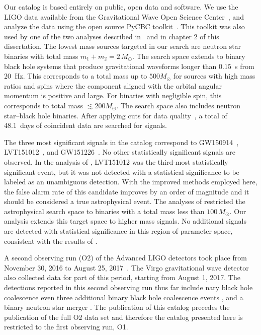 Our catalog is based entirely on public, open data and software. We use the LIGO data available from the Gravitational Wave Open Science Center~\citep{Vallisneri:2014vxa}, and analyze the data using the open source PyCBC toolkit~\citep{Usman:2015kfa,Canton:2014ena,pycbc-github}. This toolkit was also used by one of the two analyses described in~\cite{TheLIGOScientific:2016qqj} and in chapter 2 of this dissertation. The lowest mass sources targeted in our search are neutron star binaries with total mass $m_1 + m_2 = 2\, M_\odot$. The search space extends to binary black hole systems that produce gravitational waveforms longer than $0.15$~s from $20$~Hz. This corresponds to a total mass up to $500 M_{\odot}$ for sources with high mass ratios and spins where the component aligned with the orbital angular momentum is positive and large. For binaries with negligible spin, this corresponds to total mass $\lesssim 200 M_{\odot}$. The search space also includes neutron star--black hole binaries. After applying cuts for data quality~\citep{TheLIGOScientific:2016zmo,TheLIGOScientific:2017lwt}, a total of 48.1~days of coincident data are searched for signals.

The three most significant signals in the catalog correspond to GW150914~\citep{Abbott:2016blz}, LVT151012~\citep{Abbott:2016blz,TheLIGOScientific:2016pea}, and GW151226~\citep{Abbott:2016nmj}. No other statistically significant signals are observed. In the analysis of \cite{TheLIGOScientific:2016pea}, LVT151012 was the third-most statistically significant event, but it was not detected with a statistical significance to be labeled as an unambiguous detection. With the improved methods employed here, the false alarm rate of this candidate improves by an order of magnitude and it should be considered a true astrophysical event. The analyses of \cite{TheLIGOScientific:2016pea,Abbott:2016ymx} restricted the astrophysical search space to binaries with a total mass less than $100\,M_\odot$. Our analysis extends this target space to higher mass signals. No additional signals are detected with statistical significance in this region of parameter space, consistent with the results of \cite{Abbott:2017iws}. 

A second observing run (O2) of the Advanced LIGO detectors took place from November 30, 2016 to August 25, 2017~\citep{Aasi:2013wya}.  The Virgo gravitational wave detector also collected data for part of this period, starting from August 1, 2017.  The detections reported in this second observing run thus far include nary black hole coalescence even three additional binary black hole coalescence events \citep{Abbott:2017vtc,Abbott:2017gyy,Abbott:2017oio}, and a binary neutron star merger \citep{TheLIGOScientific:2017qsa}. The publication of this catalog precedes the publication of the full O2 data set and therefore the catalog presented here is restricted to the first observing run, O1.


